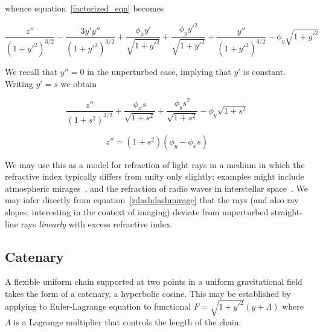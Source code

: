 \documentclass[pdflatex,sn-mathphys-num]{sn-jnl}%
\theoremstyle{thmstyleone}%
\theoremstyle{thmstyletwo}%
\theoremstyle{thmstylethree}%
\begin{document}
whence equation~\ref{factorized_eqn} becomes

\begin{equation}
    \frac{z''}{(1+y'^2)^{3/2}}
  - \frac{3y'y''}{(1+y'^2)^{3/2}}
  + \frac{\phi_xy'}{\sqrt{1+y'^2}}
  + \frac{\phi_yy'^2}{\sqrt{1+y'^2}}
  + \frac{y''}{(1+y'^2)^{3/2}}-\phi_y\sqrt{1+y'^2}
\end{equation}

We recall that $y'' = 0$ in the unperturbed case, implying that $y'$
is constant.  Writing $y'= s$ we obtain

\begin{equation}\nonumber
  \frac{z''}{(1+s^2)^{3/2}} +
  \frac{\phi_xs}{\sqrt{1+s^2}} + \frac{\phi_ys^2}{\sqrt{1+s^2}} -\phi_y\sqrt{1+s^2}
\end{equation}

\begin{equation}\label{zdashdashmirage}
  z'' = (1+s^2)(\phi_y-\phi_xs)
\end{equation}

We may use this as a model for refraction of light rays in a medium in
which the refractive index typically differs from unity only slightly;
examples might include atmospheric mirages~\cite{trankle1999}, and the
refraction of radio waves in interstellar space~\cite{romani1986}.  We
may infer directly from equation~\ref{zdashdashmirage} that the rays
(and also ray slopes, interesting in the context of imaging) deviate
from unperturbed straight-line rays {\em linearly} with excess
refractive index.


%


\subsection{Catenary}

A flexible uniform chain supported at two points in a uniform
gravitational field takes the form of a catenary, a hyperbolic cosine.
This may be established by applying to Euler-Lagrange equation to
functional $F=\sqrt{1+y'^2}(y+\Lambda)$ where $\Lambda$ is a Lagrange
multiplier that controls the length of the chain.
\end{document}
